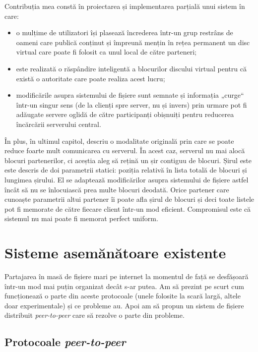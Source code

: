 \documentclass[a4wide,12pt]{report}
\newcommand{\eng}[1]{\emph{#1}} %
\begin{document}
Contribuția mea constă în proiectarea și implementarea parțială unui sistem în care:

\begin{itemize}
    \item o mulțime de utilizatori își plasează încrederea într-un grup restrâns de oameni care publică conținut și
    împreună mențin în rețea permanent un disc virtual care poate fi folosit ca unul local de către parteneri;
    \item este realizată o răspândire inteligentă a blocurilor discului virtual pentru că există o autoritate care poate
    realiza acest lucru;
    \item modificările asupra sistemului de fișiere sunt semnate și informația „curge“ într-un singur sens (de la
    clienți spre server, nu și invers) prin urmare pot fi adăugate servere oglidă de către participanți obișnuiți pentru
    reducerea încărcării serverului central.
\end{itemize}

În plus, în ultimul capitol, descriu o modalitate originală prin care se poate reduce foarte mult comunicarea cu
serverul. În acest caz, serverul nu mai alocă blocuri partenerilor, ci aceștia aleg să rețină un șir contiguu de
blocuri. Șirul este este descris de doi parametrii statici: poziția relativă în lista totală de blocuri și lungimea
șirului. El se adaptează modificărilor asupra sistemului de fișiere astfel încât să nu se înlocuiască prea multe blocuri
deodată.  Orice partener care cunoaște parametrii altui partener îi poate afla șirul de blocuri și deci toate listele
pot fi memorate de către fiecare client într-un mod eficient. Compromisul este că sistemul nu mai poate fi memorat
perfect uniform.

\chapter{Sisteme asemănătoare existente}

Partajarea în masă de fișiere mari pe internet la momentul de față se desfășoară într-un mod mai puțin organizat decât
s-ar putea. Am să prezint pe scurt cum funcționează o parte din aceste protocoale (unele folosite la scară largă, altele
doar experimentale) și ce probleme au. Apoi am să propun un sistem de fișiere distribuit \eng{peer-to-peer} care să
rezolve o parte din probleme.

\section{Protocoale \eng{peer-to-peer}} %
\end{document}
